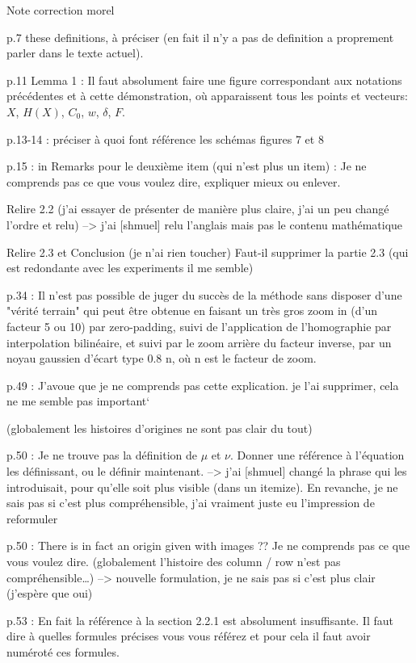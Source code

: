 Note correction morel

p.7 these definitions, à préciser (en fait il n’y a pas de definition a proprement parler dans le texte actuel).

p.11 Lemma 1 :  Il faut absolument faire une figure correspondant aux notations précédentes et à cette démonstration, où apparaissent tous  les points et vecteurs: $X$, $H(X)$, $C_0$, $w$, $\delta$, $F$.

p.13-14 : préciser à quoi font référence les schémas figures 7 et 8

p.15 : in Remarks pour le deuxième item (qui n’est plus un item) :  Je ne comprends pas ce que vous voulez dire, expliquer mieux ou enlever.

Relire 2.2 (j’ai essayer de présenter de manière plus claire, j’ai un peu changé l’ordre et relu)
--> j'ai [shmuel] relu l'anglais mais pas le contenu mathématique

Relire 2.3 et Conclusion (je n’ai rien toucher) 
Faut-il supprimer la partie 2.3 (qui est redondante avec les experiments il me semble)

p.34 : Il n'est pas possible de juger du succès de la méthode sans disposer d'une "vérité terrain" qui peut être obtenue en faisant un très gros zoom in (d'un facteur 5 ou 10) par zero-padding, suivi de l'application de l'homographie par interpolation bilinéaire, et suivi par le zoom arrière du facteur inverse, par un noyau gaussien d'écart type 0.8 n, où n est  le facteur de zoom.

p.49 : J'avoue que je ne comprends pas cette explication. 
je l’ai supprimer, cela ne me semble pas important`

(globalement les histoires d’origines ne sont pas clair du tout)

p.50 : Je ne trouve pas la définition de $\mu$ et $\nu$. Donner une référence à l'équation les définissant, ou le définir maintenant.
--> j'ai [shmuel] changé la phrase qui les introduisait, pour qu'elle soit plus visible (dans un itemize). En revanche, je ne sais pas si c'est plus compréhensible, j'ai vraiment juste eu l'impression de reformuler

p.50 : There is in fact an origin given with images ?? Je ne comprends pas ce que vous voulez dire.
(globalement l’histoire des column / row n’est pas compréhensible…)
--> nouvelle formulation, je ne sais pas si c'est plus clair (j'espère que oui)

p.53 : En fait la référence à la section 2.2.1 est absolument insuffisante. Il faut dire à quelles formules précises vous vous référez et pour cela il faut avoir numéroté ces formules.
